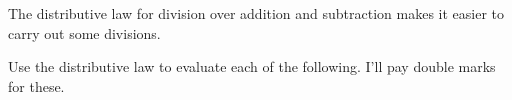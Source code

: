\begin{examples}
    The distributive law for division over addition and subtraction makes it easier to carry out some divisions.
    \begin{questions}
        \Question[2] Use the distributive law to evaluate each of the following. I'll pay double marks for these.
    \end{questions}
\end{examples}

